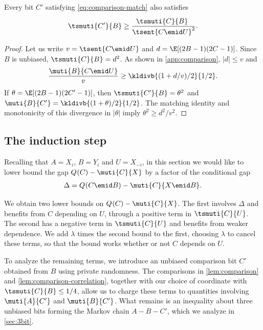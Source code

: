 \begin{lemma}
\label{lem:comparison-correlation}
Every bit $C'$ satisfying \eqref{eq:comparison-match} also satisfies
\begin{equation*}
  \tsmuti{C'}{B}\ge
  \frac{\tsmuti{C}{B}^{\phantom{2}}}{\tsent{C\emid U}^{2}}.
\end{equation*}
\end{lemma}
\begin{proof}
Let us write $v=\tsent{C\emid U}$ and
$d=\E[(2B-1)(2C-1)]$.
Since $B$ is unbiased, $\tsmuti{C}{B}=d^2$.
As shown in \autoref{app:comparison}, $|d|\le v$ and
\begin{equation*}
  \frac{\muti{B}{C\emid U}}v
  \ge\kldivb{(1+d/v)/2}{1/2}.
\end{equation*}
If $\theta=\E[(2B-1)(2C'-1)]$, then
$\tsmuti{C'}{B}=\theta^2$ and
$\muti{B}{C'}=\kldivb{(1+\theta)/2}{1/2}$.
The matching identity and monotonicity of this divergence in
$|\theta|$ imply $\theta^2\ge d^2/v^2$.
\end{proof}

\subsection{The induction step}
\label{sec:ind-step}
Recalling that $A=X_i$, $B=Y_i$ and $U=X_{-i}$,
in this section we would like to lower bound the gap
$\qent{C} - \muti{C}{X}$ by a factor of the conditional gap
\begin{align*}
\Delta=\qent{C\emid B} - \muti{C}{X\emid B}.
\end{align*}

We obtain two lower bounds on $\qent{C}-\muti{C}{X}$.
The first involves $\Delta$ and benefits from $C$ depending on
$U$, through a positive term in $\tsmuti{C}{U}$.
The second has a negative term in $\tsmuti{C}{U}$ and
benefits from weaker dependence.
We add $\lambda$ times the
second bound to the first, choosing $\lambda$ to cancel these
terms, so that the bound works whether or not $C$ depends on $U$.



To analyze the remaining terms, we introduce an unbiased
comparison bit $C'$ obtained from $B$ using private randomness.
The comparisons in \autoref{lem:comparison} and
\autoref{lem:comparison-correlation}, together with our choice
of coordinate with $\tsmuti{C}{B}\le1/4$, allow us to charge
these terms to quantities
involving $\muti{A}{C'}$ and $\muti{B}{C'}$.
What remains is an inequality about three unbiased bits 
forming the Markov chain $A-B-C'$, which we analyze in
\autoref{sec:3bit}.

